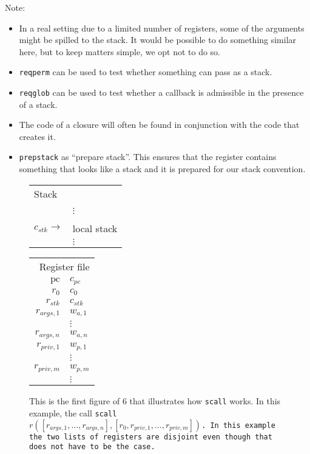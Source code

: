 \documentclass[a4paper]{article}
\newcommand{\var}[1]{\mathit{#1}}
\newcommand{\pc}{\mathit{pc}}
\newcommand{\pcreg}{\mathrm{pc}}
\begin{document}
Note:
\begin{itemize}
\item In a real setting due to a limited number of registers, some of the arguments might be spilled to the stack. It would be possible to do something similar here, but to keep
  matters simple, we opt not to do so.
\item \texttt{reqperm} can be used to test whether something can pass as a stack.
\item \texttt{reqglob} can be used to test whether a callback is admissible in the presence of a stack.
\item The code of a closure will often be found in conjunction with the code that creates it.
\item \texttt{prepstack} as ``prepare stack''. This ensures that the register contains something that looks like a stack and it is prepared for our stack convention.
\end{itemize}
\begin{figure}
  \label{fig:stack-before-call}
  \centering
  \begin{tabular}[!h]{r | >{\raggedright\arraybackslash}p{3cm} |}
    \multicolumn{2}{l}{Stack} \\
    \cline{2-2}
 & \\
 & $\vdots$\\
    \cline{2-2}
 & 0 \\
    \cline{2-2}
    $c_{\var{stk}} \rightarrow$   & local stack\\
 & $\vdots$\\
    \cline{2-2}
  \end{tabular}
  \hspace{1cm}
  \begin{tabular}{r | >{\centering\arraybackslash}p{0.75cm} |}
    \multicolumn{2}{r}{Register file} \\
    \cline{2-2}
    $\pcreg$ & $c_{\pc}$\\
    \cline{2-2}
    $r_0$  & $c_0$ \\
    \cline{2-2}
    $r_{\var{stk}}$  & $c_{\var{stk}}$ \\
    \cline{2-2}
    $r_{\var{args},1}$ & $w_{a,1}$ \\
    \cline{2-2}
             & $\vdots$ \\
    \cline{2-2}
    $r_{\var{args},n}$ & $w_{a,n}$\\
    \cline{2-2}
    $r_{\var{priv},1}$ & $w_{p,1}$\\
    \cline{2-2}
             & $\vdots$ \\
    \cline{2-2}
    $r_{\var{priv},m}$ & $w_{p,m}$\\
    \cline{2-2}
             & $\vdots$ \\
    \cline{2-2}
  \end{tabular}
  \caption{This is the first figure of 6 that illustrates how \texttt{scall} works. In this example, the call \texttt{scall $r([r_{\var{args},1},\dots,r_{\var{args},n}],[r_0,r_{\var{priv},1},\dots,r_{\var{priv},m}])$. In this example the two lists of registers are disjoint even though that does not have to be the case.}}
\end{figure}
\end{document}
